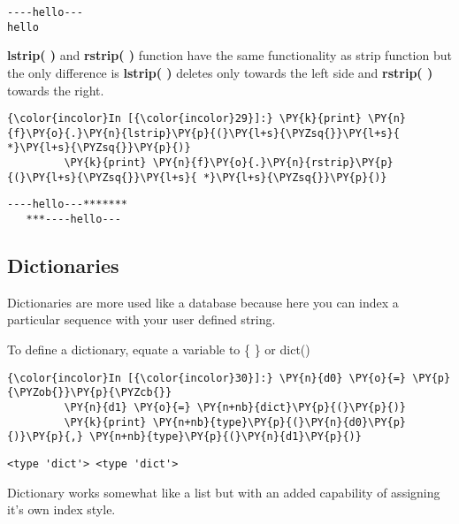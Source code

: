     \begin{Verbatim}[commandchars=\\\{\}]
----hello---
hello
    \end{Verbatim}

    \textbf{lstrip( )} and \textbf{rstrip( )} function have the same
functionality as strip function but the only difference is
\textbf{lstrip( )} deletes only towards the left side and
\textbf{rstrip( )} towards the right.

    \begin{Verbatim}[commandchars=\\\{\}]
{\color{incolor}In [{\color{incolor}29}]:} \PY{k}{print} \PY{n}{f}\PY{o}{.}\PY{n}{lstrip}\PY{p}{(}\PY{l+s}{\PYZsq{}}\PY{l+s}{ *}\PY{l+s}{\PYZsq{}}\PY{p}{)}
         \PY{k}{print} \PY{n}{f}\PY{o}{.}\PY{n}{rstrip}\PY{p}{(}\PY{l+s}{\PYZsq{}}\PY{l+s}{ *}\PY{l+s}{\PYZsq{}}\PY{p}{)}
\end{Verbatim}

    \begin{Verbatim}[commandchars=\\\{\}]
----hello---*******     
   ***----hello---
    \end{Verbatim}

    \subsection{Dictionaries}\label{dictionaries}

    Dictionaries are more used like a database because here you can index a
particular sequence with your user defined string.

    To define a dictionary, equate a variable to \{ \} or dict()

    \begin{Verbatim}[commandchars=\\\{\}]
{\color{incolor}In [{\color{incolor}30}]:} \PY{n}{d0} \PY{o}{=} \PY{p}{\PYZob{}}\PY{p}{\PYZcb{}}
         \PY{n}{d1} \PY{o}{=} \PY{n+nb}{dict}\PY{p}{(}\PY{p}{)}
         \PY{k}{print} \PY{n+nb}{type}\PY{p}{(}\PY{n}{d0}\PY{p}{)}\PY{p}{,} \PY{n+nb}{type}\PY{p}{(}\PY{n}{d1}\PY{p}{)}
\end{Verbatim}

    \begin{Verbatim}[commandchars=\\\{\}]
<type 'dict'> <type 'dict'>
    \end{Verbatim}

    Dictionary works somewhat like a list but with an added capability of
assigning it's own index style.

